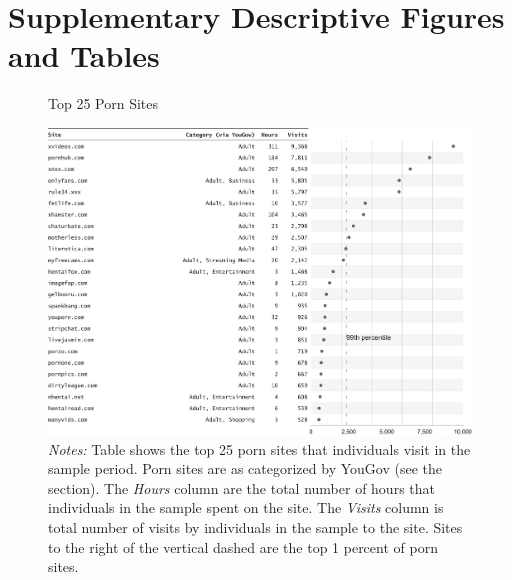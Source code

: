 \documentclass[12pt, letterpaper]{article}
\begin{document}
\section{Supplementary Descriptive Figures and Tables}
\begin{figure}[ht]
	\centering
	\caption{Top 25 Porn Sites}
	\includegraphics[width=\textwidth]{../figs/top_25_adultsites.pdf}
	\caption*{\footnotesize \emph{Notes:} 
		Table shows the top 25 porn sites that individuals visit in the sample period.
		Porn sites are as categorized by YouGov (see the  section).
		The \emph{Hours} column are the total number of hours that individuals in the sample spent on the site. 
		The \emph{Visits} column is total number of visits by individuals in the sample to the site.  
		Sites to the right of the vertical dashed are the top 1 percent of porn sites.
	}
	\label{fig:top25_adult}
\end{figure}
\end{document}
